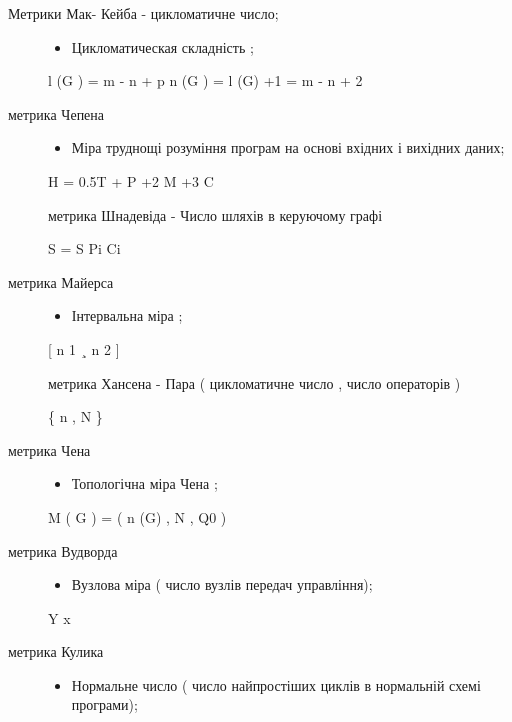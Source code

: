 \begin{description}
\item[{Метрики Мак- Кейба - цикломатичне число;}] \leavevmode\begin{itemize}
\item {} 
Цикломатическая складність ;

\end{itemize}

l (G ) = m - n + p
n (G ) = l (G) +1 = m - n + 2

\item[{метрика Чепена}] \leavevmode\begin{itemize}
\item {} 
Міра труднощі розуміння програм на основі вхідних і вихідних даних;

\end{itemize}

H = 0.5T + P +2 M +3 C

метрика Шнадевіда
- Число шляхів в керуючому графі

S = S Pi Ci

\item[{метрика Майерса}] \leavevmode\begin{itemize}
\item {} 
Інтервальна міра ;

\end{itemize}

{[} n 1 ¸ n 2 {]}

метрика Хансена
- Пара ( цикломатичне число , число операторів )

\{ n , N \}

\item[{метрика Чена}] \leavevmode\begin{itemize}
\item {} 
Топологічна міра Чена ;

\end{itemize}

M ( G ) = ( n (G) , N , Q0 )

\item[{метрика Вудворда}] \leavevmode\begin{itemize}
\item {} 
Вузлова міра ( число вузлів передач управління);

\end{itemize}

Y x

\item[{метрика Кулика}] \leavevmode\begin{itemize}
\item {} 
Нормальне число ( число найпростіших циклів в нормальній схемі програми);


\end{itemize}
\end{description}
